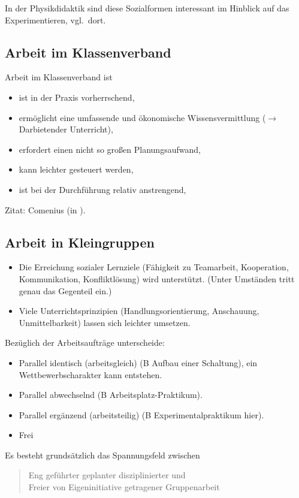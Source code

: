 In der Physikdidaktik sind  diese Sozialformen interessant
im Hinblick auf das Experimentieren, vgl.\ dort.


\subsection{Arbeit im Klassenverband}

Arbeit im Klassenverband ist
\begin{itemize}
\item ist in der Praxis vorherrschend,
\item erm\"{o}glicht eine umfassende und \"{o}konomische
Wissensvermittlung ($\to$ Darbietender Unterricht),
\item erfordert einen nicht so gro{\ss}en Planungsaufwand,
\item kann leichter gesteuert werden,
\item ist bei der Durchf\"{u}hrung relativ anstrengend,
\end{itemize}

Zitat: Comenius (in \cite[Kap. 19, S.\ 126/127]{Reble2}).


\subsection{Arbeit in Kleingruppen}

\begin{itemize}
\item Die Erreichung sozialer Lernziele
(F\"{a}higkeit zu Teamarbeit, Kooperation,
Kommunikation, Konfliktl\"{o}sung) wird unterst\"{u}tzt.
(Unter Umst\"{a}nden tritt genau das Gegenteil ein.)
\item Viele Unterrichtsprinzipien (Handlungsorientierung,
Anschauung, Unmittelbarkeit) lassen sich leichter umsetzen.
\end{itemize}

Bez\"{u}glich der Arbeitsauftr\"{a}ge unterscheide:
\begin{itemize}
\item
Parallel identisch (arbeitsgleich) (B Aufbau einer Schaltung), ein
Wettbewerbscharakter kann entstehen.
\item
Parallel abwechselnd (B Arbeitsplatz-Praktikum).
\item
Parallel erg\"{a}nzend (arbeitsteilig) (B Experimentalpraktikum hier).
\item
Frei
\end{itemize}

Es besteht grunds\"{a}tzlich das Spannungsfeld zwischen
\begin{quote}
Eng gef\"{u}hrter geplanter disziplinierter \q und \\
Freier von Eigeninitiative getragener Gruppenarbeit
\end{quote}


